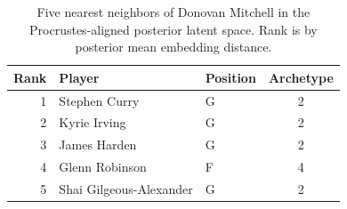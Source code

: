 \begin{table}[htbp]
  \centering\small
  \begin{tabular}{rllc}
    \toprule
    Rank & Player & Position & Archetype \\
    \midrule
    1 & Stephen Curry & G & 2 \\
    2 & Kyrie Irving & G & 2 \\
    3 & James Harden & G & 2 \\
    4 & Glenn Robinson & F & 4 \\
    5 & Shai Gilgeous-Alexander & G & 2 \\
    \bottomrule
  \end{tabular}
  \caption{Five nearest neighbors of Donovan Mitchell in the Procrustes-aligned posterior latent space. Rank is by posterior mean embedding distance.}
  \label{tab:Donovan_Mitchell_neighbors}
\end{table}

